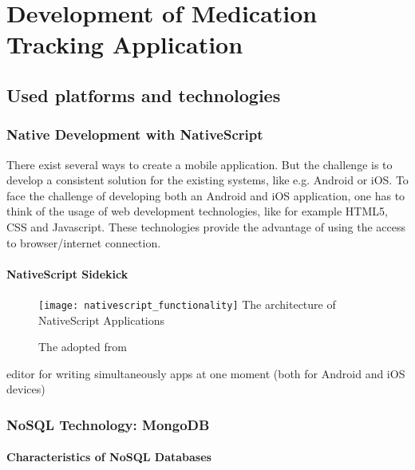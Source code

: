 \chapter{Development of Medication Tracking Application}
\label{Kap3}

\section{Used platforms and technologies} \label{platforms}

\subsection{Native Development with NativeScript} 

There exist several ways to create a mobile application. But the challenge is to develop a consistent solution for the existing systems, like e.g. Android or iOS.
To face the challenge of developing both an Android and iOS application, one has to think of the usage of web development technologies, like for example HTML5, CSS and Javascript. These technologies provide the advantage of using the access to browser/internet  connection.

\subsubsection{NativeScript Sidekick}

\begin{figure}
\centering
\texttt{[image: nativescript\_functionality]} The architecture of NativeScript Applications
\caption{\label{fig:nsarchitecture}The adopted from \cite{nsarchitecture}} 
\end{figure}



editor for writing simultaneously apps at one moment (both for Android and iOS devices)

\subsection{NoSQL Technology: MongoDB} \label{nosql}

\subsubsection{Characteristics of NoSQL Databases}

\cite{nosql_meier} 
